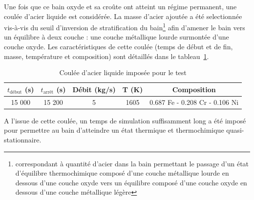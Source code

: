 Une fois que ce bain oxyde et sa croûte ont atteint un régime permanent, une coulée d'acier liquide est considérée. La masse d'acier ajoutée a été selectionnée vis-à-vis du seuil d'inversion de stratification du bain\footnote{correspondant à quantité d'acier dans la bain permettant le passage d'un état d'équilibre thermochimique composé d'une couche métallique lourde en dessous d'une couche oxyde vers un équilibre composé d'une couche oxyde en dessous d'une couche métallique légère} afin d'amener le bain vers un équilibre à deux couche : une couche métallique lourde surmontée d'une couche oxyde. Les caractéristiques de cette coulée (temps de début et de fin, masse, température et composition) sont détaillés dans le tableau~\ref{tab:coulees_acier}. 
\begin{table}
	\centering
	\begin{tabular}{ccccc} 
	\hline
	$t_{\text{début}}$ (s) &  $t_{\text{arrêt}}$ (s) & Débit (kg/s) & T (K) & Composition\\
	\hline
	15 000 & 15 200 & 5 & 1605 & 0.687 Fe - 0.208 Cr - 0.106 Ni\\
	\hline
	\end{tabular}	
	\caption{Coulée d'acier liquide imposée pour le test} 
	\label{tab:coulees_acier}
\end{table}
A l'issue de cette coulée, un temps de simulation suffisamment long a été imposé pour permettre au bain d'atteindre un état thermique et thermochimique quasi-stationnaire. 

